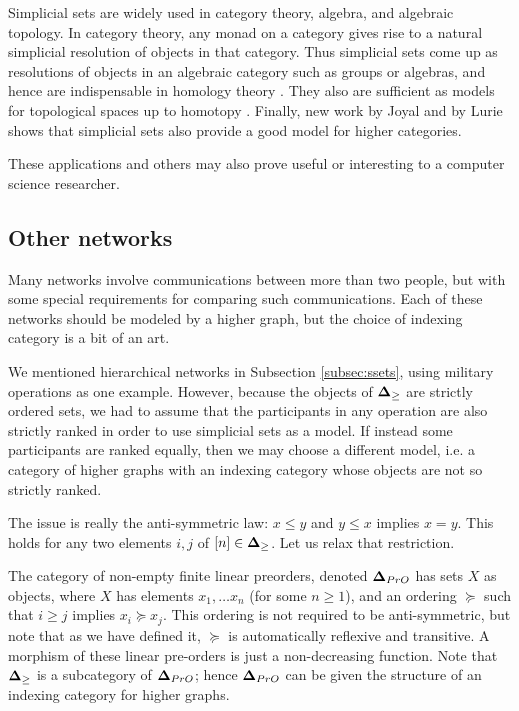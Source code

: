 \documentclass{amsart}
\def\bD{{\bf \Delta}}
\begin{document}
\begin{remark}\label{rem:power of ssets}

Simplicial sets are widely used in category theory, algebra, and algebraic topology.  In category theory, any monad on a category gives rise to a natural simplicial resolution of objects in that category.  Thus simplicial sets come up as resolutions of objects in an algebraic category such as groups or algebras, and hence are indispensable in homology theory \cite{Wei}.  They also are sufficient as models for topological spaces up to homotopy \cite{Hov}.  Finally, new work by Joyal \cite{Joy} and by Lurie \cite{Lur} shows that simplicial sets also provide a good model for higher categories.

These applications and others may also prove useful or interesting to a computer science researcher.

\end{remark}
 
\subsection{Other networks}\label{subsec:other networks}

Many networks involve communications between more than two people, but with some special requirements for comparing such communications.  Each of these networks should be modeled by a higher graph, but the choice of indexing category is a bit of an art.  

We mentioned hierarchical networks in Subsection \ref{subsec:ssets}, using military operations as one example.  However, because the objects of $\bD_\geq$ are strictly ordered sets, we had to assume that the participants in any operation are also strictly ranked in order to use simplicial sets as a model.  If instead some participants are ranked equally, then we may choose a different model, i.e. a category of higher graphs with an indexing category whose objects are not so strictly ranked.

The issue is really the anti-symmetric law: $x\leq y$ and $y\leq x$ implies $x=y$.  This holds for any two elements $i,j$ of $[n]\in\bD_\geq$.  Let us relax that restriction.

The category of non-empty finite linear preorders, denoted $\bD_{PrO}$ has sets $X$ as objects, where $X$ has elements $x_1,\ldots x_n$ (for some $n\geq 1$), and an ordering $\succeq$ such that $i\geq j$ implies $x_i\succeq x_j$.  This ordering is not required to be anti-symmetric, but note that as we have defined it, $\succeq$ is automatically reflexive and transitive.  A morphism of these linear pre-orders is just a non-decreasing function.  Note that $\bD_\geq$ is a subcategory of $\bD_{PrO}$; hence $\bD_{PrO}$ can be given the structure of an indexing category for higher graphs.  
\end{document}
